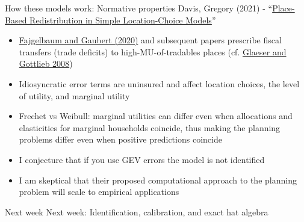 \documentclass[11pt,notes=hide,aspectratio=169]{beamer}
\begin{document}
\begin{frame}{How these models work: Normative properties}
Davis, Gregory (2021) - ``\href{https://www.nber.org/papers/w29045}{Place-Based Redistribution in Simple Location-Choice Models}''
\begin{itemize}
\item
\href{https://academic.oup.com/qje/article-abstract/135/2/959/5697213}{Fajgelbaum and Gaubert (2020)} and subsequent papers
prescribe fiscal transfers (trade deficits) to high-MU-of-tradables places
(cf. \href{https://www.brookings.edu/wp-content/uploads/2008/03/2008a_bpea_glaeser.pdf}{Glaeser and Gottlieb 2008})
\item
Idiosyncratic error terms are uninsured and affect location choices, the level of utility, and marginal utility
\item 
Frechet vs Weibull:
marginal utilities can differ even when allocations and elasticities for marginal households coincide,
thus making the planning problems differ even when positive predictions coincide
\item
I conjecture that if you use GEV errors the model is not identified
\item
I am skeptical that their proposed computational approach to the planning problem will scale to empirical applications
\end{itemize}
\end{frame}
\begin{frame}{Next week}
Next week: Identification, calibration, and exact hat algebra
\end{frame}
\end{document}
